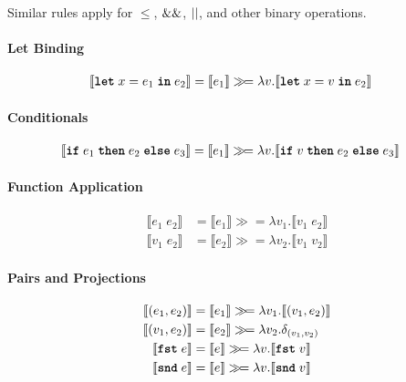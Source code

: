 Similar rules apply for $\leq$, $\mathrel{\&\&}$, $\mathrel{||}$, and other binary operations.

\paragraph{Let Binding}
\begin{align*}
\llbracket \text{\ttfamily\bfseries let} \; x = e_1 \; \text{\ttfamily\bfseries in} \; e_2 \rrbracket &= \llbracket e_1 \rrbracket \gg\!= \lambda v. \llbracket \text{\ttfamily\bfseries let} \; x = v \; \text{\ttfamily\bfseries in} \; e_2 \rrbracket
\end{align*}

\paragraph{Conditionals}
\begin{align*}
\llbracket \text{\ttfamily\bfseries if} \; e_1 \; \text{\ttfamily\bfseries then} \; e_2 \; \text{\ttfamily\bfseries else} \; e_3 \rrbracket &= \llbracket e_1 \rrbracket \gg\!= \lambda v. \llbracket \text{\ttfamily\bfseries if} \; v \; \text{\ttfamily\bfseries then} \; e_2 \; \text{\ttfamily\bfseries else} \; e_3 \rrbracket
\end{align*}

\paragraph{Function Application}
\begin{align*}
\llbracket e_1 \; e_2 \rrbracket &= \llbracket e_1 \rrbracket \gg\!= \lambda v_1. \llbracket v_1 \; e_2 \rrbracket \\
\llbracket v_1 \; e_2 \rrbracket &= \llbracket e_2 \rrbracket \gg\!= \lambda v_2. \llbracket v_1 \; v_2 \rrbracket
\end{align*}

\paragraph{Pairs and Projections}
\begin{align*}
\llbracket (e_1, e_2) \rrbracket &= \llbracket e_1 \rrbracket \gg\!= \lambda v_1. \llbracket (v_1, e_2) \rrbracket \\
\llbracket (v_1, e_2) \rrbracket &= \llbracket e_2 \rrbracket \gg\!= \lambda v_2. \delta_{(v_1, v_2)} \\
\llbracket \text{\ttfamily\bfseries fst} \; e \rrbracket &= \llbracket e \rrbracket \gg\!= \lambda v. \llbracket \text{\ttfamily\bfseries fst} \; v \rrbracket \\
\llbracket \text{\ttfamily\bfseries snd} \; e \rrbracket &= \llbracket e \rrbracket \gg\!= \lambda v. \llbracket \text{\ttfamily\bfseries snd} \; v \rrbracket
\end{align*}

